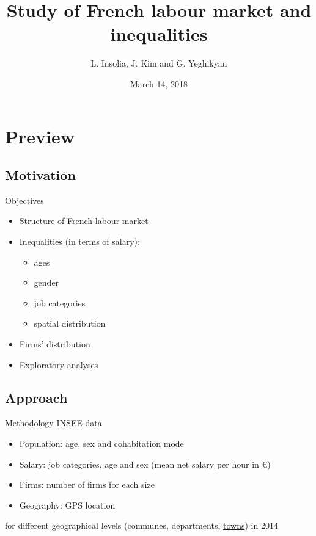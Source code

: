 \documentclass[12pt]{beamer}
\title[Study of French labour market and inequalities]{Study of French labour market and inequalities}
\author{L. Insolia, J. Kim and G. Yeghikyan}
\institute{SNS \\
		   \vskip0.5cm\centering\small \textcolor{rscuro}{--- \emph{Midterm results} ---}}
\date{March 14, 2018}
\begin{document}
	
\begin{frame}
	
	\maketitle
\end{frame}


\section{Preview}

\subsection{Motivation}

\begin{frame}{\textcolor{bscuro}{Objectives}}
	\begin{itemize}
		\item Structure of French labour market 
		\item Inequalities (in terms of salary): 
		\begin{itemize}
			\item ages 
			\item gender
			\item job categories
			\item spatial distribution
		\end{itemize}
		\item Firms' distribution
		\item Exploratory analyses
	\end{itemize}
\end{frame}
		

\subsection{Approach}

\begin{frame}{\textcolor{bscuro}{Methodology}}
	INSEE data
	\begin{itemize}
		\item Population: age, sex and cohabitation mode
		\item Salary: job categories, age and sex (mean net salary per hour in \euro)
		\item Firms: number of firms for each size
		\item Geography: GPS location
	\end{itemize}
	for different geographical levels (communes, departments, \underline{towns}) in 2014
\end{frame}
				
\end{document}
